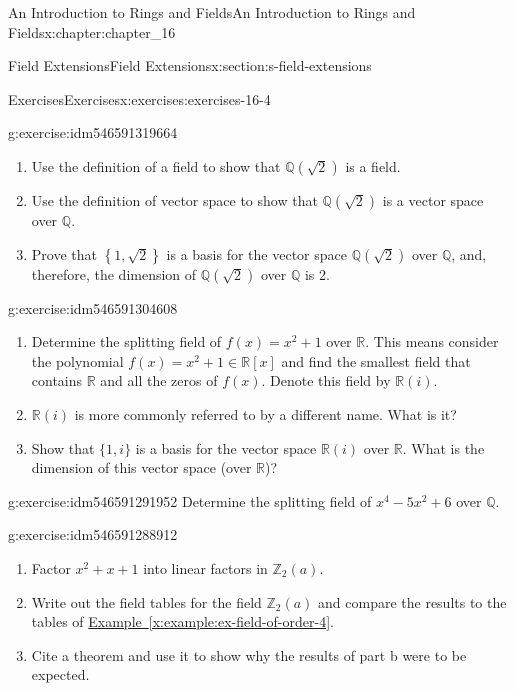 \documentclass[oneside,10pt,]{book}
\newcommand{\xreffont}{\relax}
\numberwithin{equation}{section}
\begin{document}
\begin{chapterptx}{An Introduction to Rings and Fields}{}{An Introduction to Rings and Fields}{}{}{x:chapter:chapter_16}
\begin{sectionptx}{Field Extensions}{}{Field Extensions}{}{}{x:section:s-field-extensions}
\begin{exercises-subsection}{Exercises}{}{Exercises}{}{}{x:exercises:exercises-16-4}
\begin{divisionexercise}{1}{}{}{g:exercise:idm546591319664}
%
\begin{enumerate}[label=(\alph*)]
\item{}Use the definition of a field to show that \(\mathbb{Q}(\sqrt{2})\) is a field.%
\item{}Use the definition of vector space to show that \(\mathbb{Q}\left(\sqrt{2}\right)\) is a vector space over \(\mathbb{Q}\).%
\item{}Prove that \(\left\{1,\sqrt{2}\right\}\) is a basis for the vector space \(\mathbb{Q}\left(\sqrt{2}\right)\) over \(\mathbb{Q}\), and, therefore, the dimension of  \(\mathbb{Q}(\sqrt{2})\) over \(\mathbb{Q}\) is 2.%
\end{enumerate}
%
\end{divisionexercise}%
\begin{divisionexercise}{2}{}{}{g:exercise:idm546591304608}%
%
\begin{enumerate}[label=(\alph*)]
\item{}Determine the splitting field of \(f(x) = x^2+ 1\) over \(\mathbb{R}\). This means consider the polynomial \(f(x) = x^2+1 \in  \mathbb{R}[x]\) and find the smallest field that contains \(\mathbb{R}\) and all the zeros of \(f(x)\).  Denote this field by \(\mathbb{R}(i)\).%
\item{}\(\mathbb{R}(i)\) is more commonly referred to by a different name. What is it?%
\item{}Show that \(\{1, i\}\) is a basis for the vector space \(\mathbb{R}(i)\) over \(\mathbb{R}\). What is the dimension of this vector space (over \(\mathbb{R}\))?%
\end{enumerate}
%
\end{divisionexercise}%
\begin{divisionexercise}{3}{}{}{g:exercise:idm546591291952}%
Determine the splitting field of \(x^4 - 5x^2 + 6\) over \(\mathbb{Q}\).%
\end{divisionexercise}%
\begin{divisionexercise}{4}{}{}{g:exercise:idm546591288912}%
%
\begin{enumerate}[label=(\alph*)]
\item{}Factor \(x^2 + x + 1\) into linear factors in \(\mathbb{Z}_2(a)\).%
\item{}Write out the field tables for the field \(\mathbb{Z}_2(a)\) and compare the results to the tables of \hyperref[x:example:ex-field-of-order-4]{Example~{\xreffont\ref{x:example:ex-field-of-order-4}}}.%
\item{}Cite a theorem and use it to show why the results of part b were to be expected.%

\end{enumerate}
\end{divisionexercise}
\end{exercises-subsection}
\end{sectionptx}
\end{chapterptx}
\end{document}
